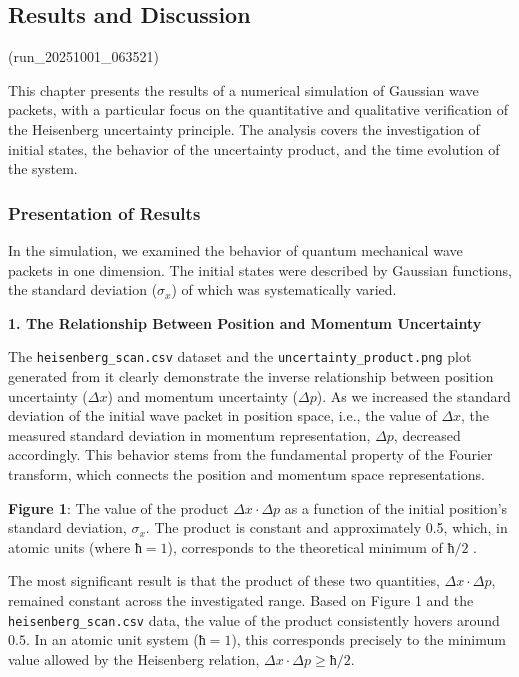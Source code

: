 \subsection{Results and Discussion}\label{results-and-discussion}

(run\_20251001\_063521)

This chapter presents the results of a numerical simulation of Gaussian
wave packets, with a particular focus on the quantitative and
qualitative verification of the Heisenberg uncertainty principle. The
analysis covers the investigation of initial states, the behavior of the
uncertainty product, and the time evolution of the system.

\subsubsection{Presentation of Results}\label{presentation-of-results}

In the simulation, we examined the behavior of quantum mechanical wave
packets in one dimension. The initial states were described by Gaussian
functions, the standard deviation (\(σ_x\)) of which was systematically
varied.

\textbf{1. The Relationship Between Position and Momentum Uncertainty}

The \texttt{heisenberg\_scan.csv} dataset and the
\texttt{uncertainty\_product.png} plot generated from it clearly
demonstrate the inverse relationship between position uncertainty
(\(Δx\)) and momentum uncertainty (\(Δp\)). As we increased the standard
deviation of the initial wave packet in position space, i.e., the value
of \(Δx\), the measured standard deviation in momentum representation,
\(Δp\), decreased accordingly. This behavior stems from the fundamental
property of the Fourier transform, which connects the position and
momentum space representations.

\textbf{Figure 1}: The value of the product \(Δx·Δp\) as a function of
the initial position's standard deviation, \(σ_x\). The product is
constant and approximately 0.5, which, in atomic units (where \(ħ=1\)),
corresponds to the theoretical minimum of \(ħ/2\) .

The most significant result is that the product of these two quantities,
\(Δx·Δp\), remained constant across the investigated range. Based on
Figure 1 and the \texttt{heisenberg\_scan.csv} data, the value of the
product consistently hovers around \(0.5\). In an atomic unit system
(\(ħ=1\)), this corresponds precisely to the minimum value allowed by
the Heisenberg relation, \(Δx·Δp ≥ ħ/2\).


